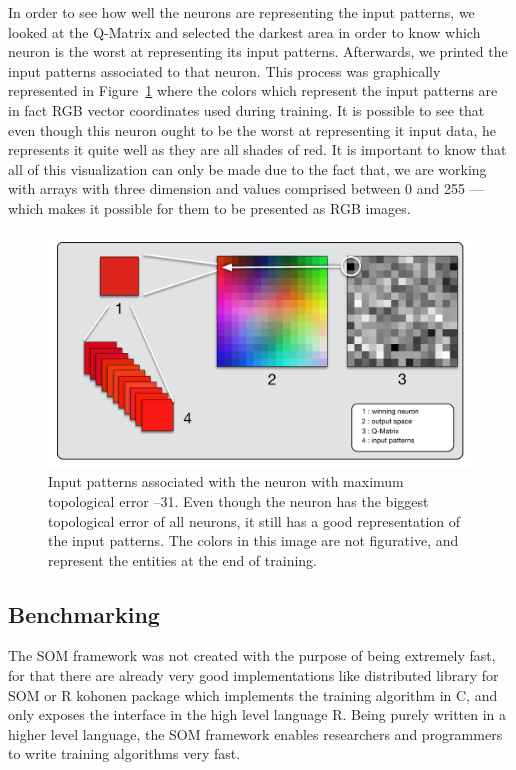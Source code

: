 \documentclass[journal]{IEEEtran}
\begin{document}
In order to see how well the neurons are representing the input patterns, we looked at the \ac{Q-Matrix} and selected the darkest area in order to know which neuron is the worst at representing its input patterns. Afterwards, we printed the input patterns associated to that neuron. This process was graphically represented in Figure~\ref{fig:somtrained} where the colors which represent the input patterns are in fact RGB vector coordinates used during training. It is possible to see that even though this neuron ought to be the worst at representing it input data, he represents it quite well as they are all shades of red. 
It is important to know that all of this visualization can only be made due to the fact that, we are working with arrays with three dimension and values comprised between 0 and 255 --- which makes it possible for them to be presented as RGB images. 

\begin{figure}[h!]
  \centering
  \includegraphics[width=1\linewidth]{./images/som_trainned.pdf}
  \caption{Input patterns associated with the neuron with maximum topological error --31. Even though the neuron has the biggest topological error of all neurons, it still has a good representation of the input patterns. The colors in this image are not figurative, and represent the entities at the end of training.  }
  \label{fig:somtrained}
\end{figure}

\subsection{Benchmarking}
\label{sub:benchmarking}
The \ac{SOM} framework was not created with the purpose of being extremely fast, for that there are already very good implementations like \citet{somoclu} distributed library for \ac{SOM} or \citet{rsom} R kohonen package which implements the training algorithm in C, and only exposes the interface in the high level language R.  
Being purely written in a higher level language, the \ac{SOM} framework enables researchers and programmers to write training algorithms very fast. 
\end{document}
